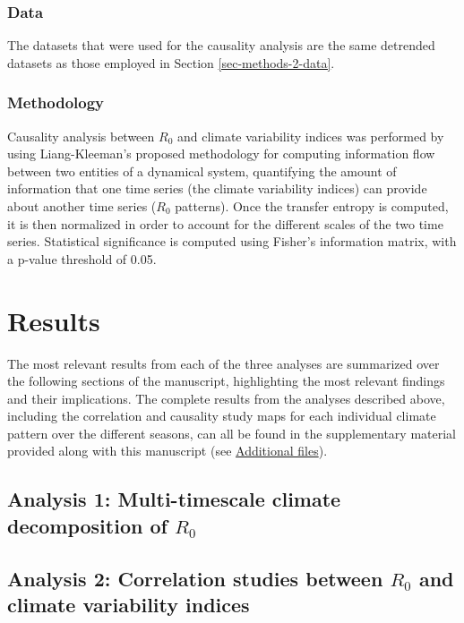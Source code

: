 \documentclass[article,10pt,twocolumn]{wlscirep}
\begin{document}
\subsubsection{Data} \label{sec-methods-3-data}

The datasets that were used for the causality analysis are the same detrended datasets as those employed in Section \ref{sec-methods-2-data}.

\subsubsection{Methodology} \label{sec-methods-3-methodology}

Causality analysis between $R_0$ and climate variability indices was performed by using Liang-Kleeman's proposed methodology for computing information flow between two entities of a dynamical system, quantifying the amount of information that one time series (the climate variability indices) can provide about another time series ($R_0$ patterns). Once the transfer entropy is computed, it is then normalized in order to account for the different scales of the two time series. Statistical significance is computed using Fisher's information matrix, with a p-value threshold of 0.05.

\section{Results}

The most relevant results from each of the three analyses are summarized over the following sections of the manuscript, highlighting the most relevant findings and their implications. The complete results from the analyses described above, including the correlation and causality study maps for each individual climate pattern over the different seasons, can all be found in the supplementary material provided along with this manuscript (see \hyperref[sec-additional-files]{Additional files}).


\subsection{Analysis 1: Multi-timescale climate decomposition of $R_0$} \label{sec-results-1}



\subsection{Analysis 2: Correlation studies between $R_0$ and climate variability indices} \label{sec-results-2} \label{sec-results-2}
\end{document}
